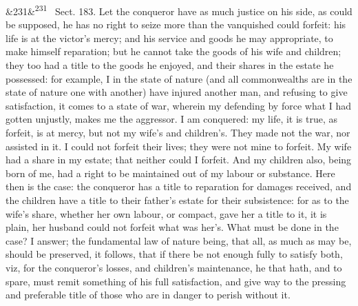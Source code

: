 \documentclass[12pt]{article}
\newcommand{\para}[1][]{\par\noindent\ifx&#1&\else\textsuperscript{\footnotesize #1}~\fi}
\begin{document}
\para[231] Sect. 183. Let the conqueror have as much justice on his side, as could be supposed, he has no right to seize more than the vanquished could forfeit: his life is at the victor's mercy; and his service and goods he may appropriate, to make himself reparation; but he cannot take the goods of his wife and children; they too had a title to the goods he enjoyed, and their shares in the estate he possessed: for example, I in the state of nature (and all commonwealths are in the state of nature one with another) have injured another man, and refusing to give satisfaction, it comes to a state of war, wherein my defending by force what I had gotten unjustly, makes me the aggressor. I am conquered: my life, it is true, as forfeit, is at mercy, but not my wife's and children's. They made not the war, nor assisted in it. I could not forfeit their lives; they were not mine to forfeit. My wife had a share in my estate; that neither could I forfeit. And my children also, being born of me, had a right to be maintained out of my labour or substance. Here then is the case: the conqueror has a title to reparation for damages received, and the children have a title to their father's estate for their subsistence: for as to the wife's share, whether her own labour, or compact, gave her a title to it, it is plain, her husband could not forfeit what was her's. What must be done in the case? I answer; the fundamental law of nature being, that all, as much as may be, should be preserved, it follows, that if there be not enough fully to satisfy both, viz, for the conqueror's losses, and children's maintenance, he that hath, and to spare, must remit something of his full satisfaction, and give way to the pressing and preferable title of those who are in danger to perish without it.
\end{document}
